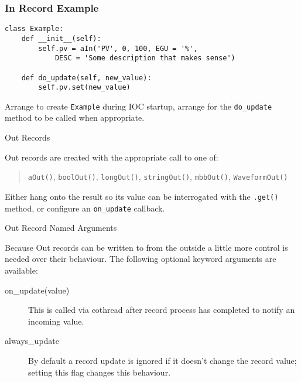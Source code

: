 \documentclass{beamer}
\begin{document}
%
\begin{frame}[fragile]\frametitle{In Record Example}

\lstset{language=Python}
\begin{lstlisting}
class Example:
    def __init__(self):
        self.pv = aIn('PV', 0, 100, EGU = '%',
            DESC = 'Some description that makes sense')

    def do_update(self, new_value):
        self.pv.set(new_value)
\end{lstlisting}

Arrange to create \texttt{Example} during IOC startup, arrange for the
\texttt{do\_update} method to be called when appropriate.

\end{frame}


%
\begin{frame}{Out Records}

Out records are created with the appropriate call to one of:

\begin{quote}
\texttt{aOut()}, \texttt{boolOut()}, \texttt{longOut()}, \texttt{stringOut()},
\texttt{mbbOut()}, \texttt{WaveformOut()}
\end{quote}

Either hang onto the result so its value can be interrogated with the
\texttt{.get()} method, or configure an \texttt{on\_update} callback.

\end{frame}


%
\begin{frame}{Out Record Named Arguments}

Because Out records can be written to from the outside a little more control is
needed over their behaviour.  The following optional keyword arguments are
available:

\begin{description}
\item[on\_update(value)]
This is called via cothread after record process has completed to notify an
incoming value.
\item[always\_update]
By default a record update is ignored if it doesn't change the record value;
setting this flag changes this behaviour.
\end{description}

\end{frame}
\end{document}

